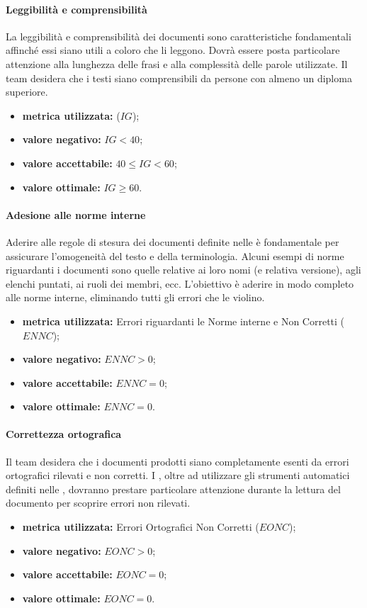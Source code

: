 		\paragraph{Leggibilità e comprensibilità}
			\label{OLEC}
			La leggibilità e comprensibilità dei documenti sono caratteristiche fondamentali affinché essi siano utili a coloro che li leggono. Dovrà essere posta particolare attenzione alla lunghezza delle frasi e alla complessità delle parole utilizzate. Il team desidera che i testi siano comprensibili da persone con almeno un diploma superiore.
			\begin{itemize}
				\item \textbf{metrica utilizzata:}  ($IG$);
				\item \textbf{valore negativo:} $IG<40$;
				\item \textbf{valore accettabile:} $40\leq IG <60$;
				\item \textbf{valore ottimale:} $IG\geq 60$.
			\end{itemize}

		\paragraph{Adesione alle norme interne}
			\label{OAANI}
			Aderire alle regole di stesura dei documenti definite nelle \ndpv{} è fondamentale per assicurare l'omogeneità del testo e della terminologia. Alcuni esempi di norme riguardanti i documenti sono quelle relative ai loro nomi (e relativa versione), agli elenchi puntati, ai ruoli dei membri, ecc. L'obiettivo è aderire in modo completo alle norme interne, eliminando tutti gli errori che le violino.			
			\begin{itemize}
				\item \textbf{metrica utilizzata:} Errori riguardanti le Norme interne e Non Corretti ($ENNC$);
				\item \textbf{valore negativo:} $ENNC>0$;
				\item \textbf{valore accettabile:} $ENNC=0$;
				\item \textbf{valore ottimale:} $ENNC=0$.
			\end{itemize}

		\paragraph{Correttezza ortografica}
			\label{OCO}
			Il team desidera che i documenti prodotti siano completamente esenti da errori ortografici rilevati e non corretti. I \verificatori, oltre ad utilizzare gli strumenti automatici definiti nelle \ndpv, dovranno prestare particolare attenzione durante la lettura del documento per scoprire errori non rilevati.
			\begin{itemize}
				\item \textbf{metrica utilizzata:} Errori Ortografici Non Corretti ($EONC$);
				\item \textbf{valore negativo:} $EONC>0$;
				\item \textbf{valore accettabile:} $EONC=0$;
				\item \textbf{valore ottimale:} $EONC=0$.
			\end{itemize}

